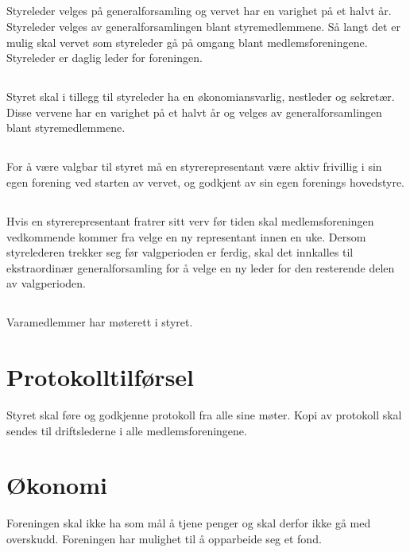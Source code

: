 \documentclass[11pt]{article}
\begin{document}
\subsection{}
\label{sub:5.3}
Styreleder velges på generalforsamling og vervet har en varighet på et halvt år.
Styreleder velges av generalforsamlingen blant styremedlemmene.
Så langt det er mulig skal vervet som styreleder gå på omgang blant medlemsforeningene.
Styreleder er daglig leder for foreningen.
\subsection{}
\label{sub:5.4}
Styret skal i tillegg til styreleder ha en økonomiansvarlig, nestleder og sekretær.
Disse vervene har en varighet på et halvt år og velges av generalforsamlingen
blant styremedlemmene.
\subsection{}
\label{sub:5.5}
For å være valgbar til styret må en styrerepresentant være aktiv frivillig i sin egen
forening ved starten av vervet, og godkjent av sin egen forenings hovedstyre.
\subsection{}
\label{sub:5.6}
Hvis en styrerepresentant fratrer sitt verv før tiden skal medlemsforeningen
vedkommende kommer fra velge en ny representant innen en uke.
Dersom styrelederen trekker seg før valgperioden er ferdig,
skal det innkalles til ekstraordinær generalforsamling for
å velge en ny leder for den resterende delen av valgperioden.
\subsection{}
\label{sub:5.7}
Varamedlemmer har møterett i styret.
\section{Protokolltilførsel}
\label{sec:6}
Styret skal føre og godkjenne protokoll fra alle sine møter.
Kopi av protokoll skal sendes til driftslederne i alle medlemsforeningene.
\section{Økonomi}
\label{sec:7}
Foreningen skal ikke ha som mål å tjene penger og skal derfor ikke gå med overskudd.
Foreningen har mulighet til å opparbeide seg et fond.
\end{document}
